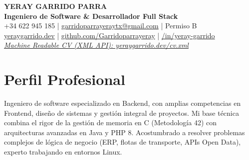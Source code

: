 \documentclass[a4paper,10pt]{article}
\begin{document}
\begin{center}
    {\huge \textbf{YERAY GARRIDO PARRA}} \\ \vspace{4pt}
    {\large \textbf{Ingeniero de Software \& Desarrollador Full Stack}} \\ \vspace{6pt}
    \small
    \faPhone*\hspace{0.5em} +34 622 945 185 \hspace{0.5em} | \hspace{0.5em}
    \faEnvelope \hspace{0.5em} \href{mailto:garridoparrayeraytx@gmail.com}{garridoparrayeraytx@gmail.com} \hspace{0.5em} | \hspace{0.5em}
    \faCar \hspace{0.5em} Permiso B \\ \vspace{3pt}
    \faGlobe \hspace{0.5em} \href{https://yeraygarrido.dev}{yeraygarrido.dev} \hspace{0.5em} | \hspace{0.5em}
    \faGithub \hspace{0.5em} \href{https://github.com/Garridoparrayeray}{github.com/Garridoparrayeray} \hspace{0.5em} | \hspace{0.5em}
    \faLinkedin\href{https://www.linkedin.com/in/yeray-garrido}{/in/yeray-garrido} \\ \vspace{3pt}
    \faCode \textit{ \href{https://yeraygarrido.dev/cv.xml}{Machine Readable CV (XML API): yeraygarrido.dev/cv.xml}}
\end{center}

\vspace{4pt}

\section{Perfil Profesional}
Ingeniero de software especializado en Backend, con amplias competencias en Frontend, diseño de sistemas y gestión integral de proyectos. Mi base técnica combina el rigor de la gestión de memoria en C (Metodología 42) con arquitecturas avanzadas en Java y PHP 8. Acostumbrado a resolver problemas complejos de lógica de negocio (ERP, flotas de transporte, APIs Open Data), experto trabajando en entornos Linux.
\end{document}
